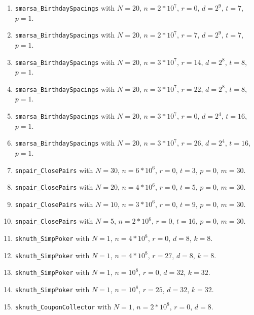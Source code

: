 \begin{enumerate}
  \item {\tt smarsa\_BirthdaySpacings}  with $N=20$,  $n=2*10^7$, $r=0$,
   $d = 2^{9}$, $t=7$, $p=1$.

  \item {\tt smarsa\_BirthdaySpacings}  with $N=20$,  $n=2*10^7$, $r=7$,
   $d = 2^{9}$, $t=7$, $p=1$.

  \item {\tt smarsa\_BirthdaySpacings}  with $N=20$,  $n=3*10^7$, $r=14$,
   $d = 2^{8}$, $t=8$, $p=1$.

  \item {\tt smarsa\_BirthdaySpacings}  with $N=20$,  $n=3*10^7$, $r=22$,
   $d = 2^{8}$, $t=8$, $p=1$.

  \item {\tt smarsa\_BirthdaySpacings}  with $N=20$,  $n=3*10^7$, $r=0$,
   $d = 2^{4}$, $t=16$, $p=1$.

  \item {\tt smarsa\_BirthdaySpacings}  with $N=20$,  $n=3*10^7$, $r=26$,
   $d = 2^{4}$, $t=16$, $p=1$.

  \item {\tt snpair\_ClosePairs}  with $N=30$,  $n=6*10^6$, $r=0$, $t=3$,
   $p=0$,  $m=30$.

  \item {\tt snpair\_ClosePairs}  with $N=20$,  $n=4*10^6$, $r=0$, $t=5$,
   $p=0$,  $m=30$.

  \item {\tt snpair\_ClosePairs}  with $N=10$,  $n=3*10^6$, $r=0$, $t=9$,
   $p=0$,  $m=30$.

  \item {\tt snpair\_ClosePairs}  with $N=5$,  $n=2*10^6$, $r=0$, $t=16$,
   $p=0$,  $m=30$.

  \item {\tt sknuth\_SimpPoker} with $N=1$,  $n=4*10^8$,  $r=0$, $d=8$, $k=8$.

  \item {\tt sknuth\_SimpPoker} with $N=1$,  $n=4*10^8$,  $r=27$, $d=8$, $k=8$.

  \item {\tt sknuth\_SimpPoker} with $N=1$,  $n=10^8$,  $r=0$, $d=32$, $k=32$.

  \item {\tt sknuth\_SimpPoker} with $N=1$,  $n=10^8$,  $r=25$, $d=32$, $k=32$.

  \item {\tt sknuth\_CouponCollector} with $N=1$, $n=2*10^8$, $r=0$, $d=8$.


\end{enumerate}
